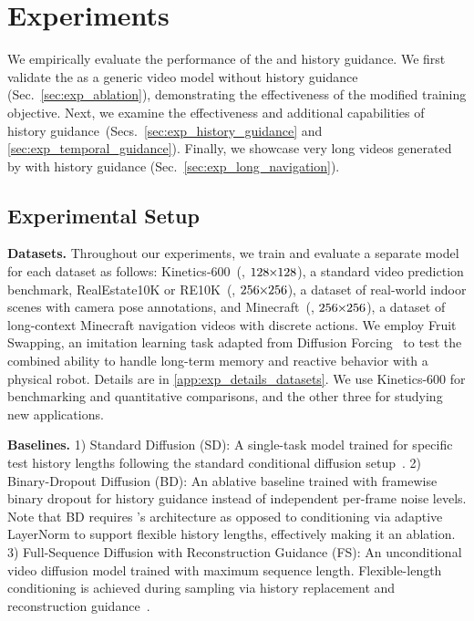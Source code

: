 \section{Experiments}
\label{sec:experiments}

We empirically evaluate the performance of the \method and history guidance. We first validate the \mtd as a generic video model without history guidance (Sec.~\ref{sec:exp_ablation}), demonstrating the effectiveness of the modified training objective. Next, we examine the effectiveness and additional capabilities of history guidance~(Secs.~\ref{sec:exp_history_guidance} and \ref{sec:exp_temporal_guidance}). Finally, we showcase very long videos generated by \mtd with history guidance (Sec.~\ref{sec:exp_long_navigation}).


\subsection{Experimental Setup}
\label{sec:exp_setup}

\textbf{Datasets.} Throughout our experiments, we train and evaluate a separate \mtd model for each dataset as follows: Kinetics-600~(\citet{kay2017kinetics}, $128 \mkern-5mu \times \mkern-5mu 128$), a standard video prediction benchmark, RealEstate10K or RE10K~(\citet{zhou2018stereo}, $256 \mkern-5mu \times \mkern-5mu 256$), a dataset of real-world indoor scenes with camera pose annotations, and Minecraft~(\citet{yan2023temporally}, $256 \mkern-5mu \times \mkern-5mu 256$), a dataset of long-context Minecraft navigation videos with discrete actions. We employ Fruit Swapping, an imitation learning task adapted from Diffusion Forcing~\cite{chen2024diffusion} to test the combined ability to handle long-term memory and reactive behavior with a physical robot. Details are in \cref{app:exp_details_datasets}. We use Kinetics-600 for benchmarking and quantitative comparisons, and the other three for studying new applications.

\textbf{Baselines.} 
1) Standard Diffusion (SD): A single-task model trained for specific test history lengths following the standard conditional diffusion setup~\cite{gupta2023photorealistic, watson2024controlling}.
2) Binary-Dropout Diffusion (BD): An ablative baseline trained with framewise binary dropout for history guidance instead of independent per-frame noise levels. Note that BD requires \mtd's architecture as opposed to conditioning via adaptive LayerNorm to support flexible history lengths, effectively making it an ablation.
3) Full-Sequence Diffusion with Reconstruction Guidance (FS): An unconditional video diffusion model trained with maximum sequence length. Flexible-length conditioning is achieved during sampling via history replacement and reconstruction guidance~\cite{ho2022video}.

